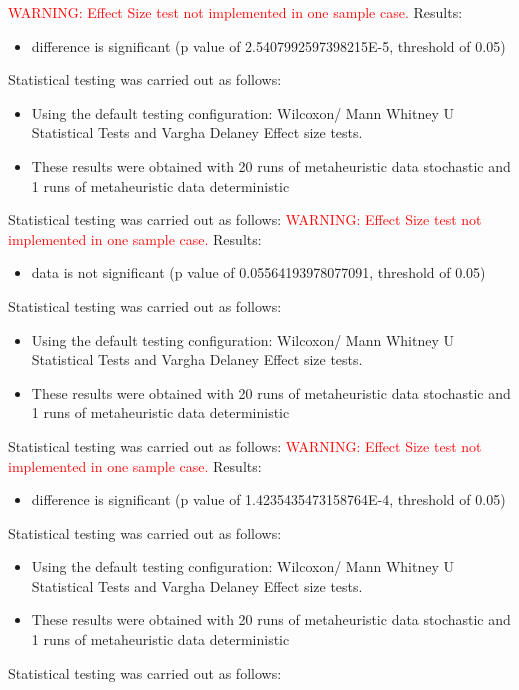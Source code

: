 \documentclass[]{article}
\begin{document}
\textcolor{Red}{WARNING: Effect Size test not implemented in one sample case.
}
Results:
\begin{itemize}
\item{difference is significant (p value of 2.5407992597398215E-5, threshold of 0.05)}
\end{itemize}Statistical testing was carried out as follows: \begin{itemize}
\item{Using the default testing configuration: Wilcoxon/ Mann Whitney U Statistical Tests and Vargha Delaney Effect size tests.}
\item{These results were obtained with 20 runs of metaheuristic data stochastic and 1 runs of metaheuristic data deterministic}
\end{itemize}Statistical testing was carried out as follows: 
\textcolor{Red}{WARNING: Effect Size test not implemented in one sample case.
}
Results:
\begin{itemize}
\item{data is not significant (p value of 0.05564193978077091, threshold of 0.05)}
\end{itemize}Statistical testing was carried out as follows: \begin{itemize}
\item{Using the default testing configuration: Wilcoxon/ Mann Whitney U Statistical Tests and Vargha Delaney Effect size tests.}
\item{These results were obtained with 20 runs of metaheuristic data stochastic and 1 runs of metaheuristic data deterministic}
\end{itemize}Statistical testing was carried out as follows: 
\textcolor{Red}{WARNING: Effect Size test not implemented in one sample case.
}
Results:
\begin{itemize}
\item{difference is significant (p value of 1.4235435473158764E-4, threshold of 0.05)}
\end{itemize}Statistical testing was carried out as follows: \begin{itemize}
\item{Using the default testing configuration: Wilcoxon/ Mann Whitney U Statistical Tests and Vargha Delaney Effect size tests.}
\item{These results were obtained with 20 runs of metaheuristic data stochastic and 1 runs of metaheuristic data deterministic}
\end{itemize}Statistical testing was carried out as follows: 
\end{document}
